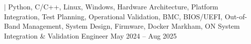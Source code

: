   {$|$ Python, C/C++, Linux, Windows, Hardware Architecture, Platform Integration, Test Planning, Operational Validation, BMC, BIOS/UEFI, Out-of-Band Management, System Design, Firmware, Docker}
  {Markham, ON}
  {System Integration \& Validation Engineer}
  {May 2024 -- Aug 2025}

\resumeItemListStart




